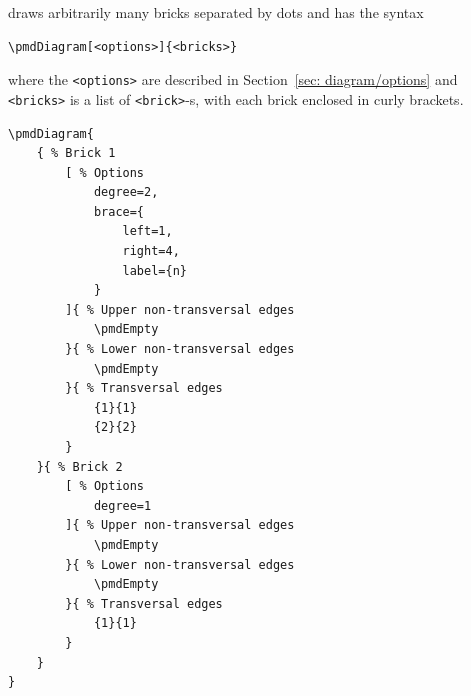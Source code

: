 \documentclass{ltxdoc}
\begin{document}
\DescribeMacro{\pmdDiagram}
draws arbitrarily many bricks separated by dots and has the syntax
\begin{verbatim}
\pmdDiagram[<options>]{<bricks>}
\end{verbatim}
where
the \texttt{<options>} are described in Section~\ref{sec: diagram/options} and
\texttt{<bricks>} is a list of \texttt{<brick>}-s, with each brick enclosed in curly brackets.
\begin{center}
    \begin{minipage}{\dimexpr0.85\textwidth-2\fboxrule-2\fboxsep\relax}
        \begin{minipage}[c]{0.4\linewidth}
\begin{verbatim}
\pmdDiagram{
    { % Brick 1
        [ % Options
            degree=2,
            brace={
                left=1,
                right=4,
                label={n}
            }
        ]{ % Upper non-transversal edges
            \pmdEmpty
        }{ % Lower non-transversal edges
            \pmdEmpty
        }{ % Transversal edges
            {1}{1}
            {2}{2}
        }
    }{ % Brick 2
        [ % Options
            degree=1
        ]{ % Upper non-transversal edges
            \pmdEmpty
        }{ % Lower non-transversal edges
            \pmdEmpty
        }{ % Transversal edges
            {1}{1}
        }
    }
}
\end{verbatim}
        \end{minipage}
        \hfill
        \begin{minipage}[c]{0.4\linewidth}
        \end{minipage}
    \end{minipage}%
\end{center}
\begin{center}
\end{center}
\end{document}
